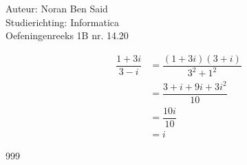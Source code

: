 \documentclass[a4paper]{article}
\begin{document}
  
\noindent \large Auteur: Noran Ben Said \\
\noindent \large Studierichting: Informatica\\
\noindent \large Oefeningenreeks 1B nr. 14.20 \\

\medskip

\normalsize

\begin{align*}
\dfrac{1 + 3i}{3 - i} &= \dfrac{(1 + 3i)(3 + i)}{3^2 + 1^2} \\
&= \dfrac{3 + i + 9i + 3i^2}{10} \\
&= \dfrac{10i}{10} \\
&= i
\end{align*}



\begin{thebibliography}{999}
\end{thebibliography}
\end{document}
